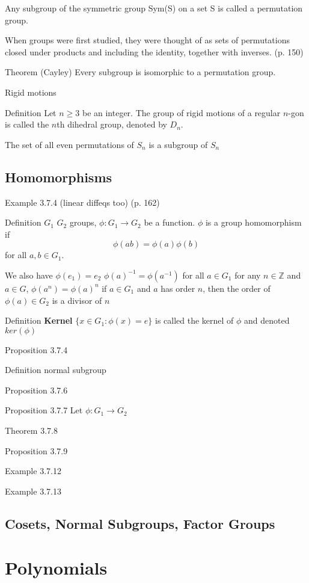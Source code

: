 \documentclass[12pt]{article}
\newcommand{\Z}{\mathbb{Z}}
\begin{document}
Any subgroup of the symmetric group Sym(S) on a set S is called a permutation group.

When groups were first studied, they were thought of as sets of permutations closed under products and including the identity, together with inverses. (p. 150)

Theorem (Cayley) Every subgroup is isomorphic to a permutation group.

Rigid motions

Definition Let $n \geq 3$ be an integer. The group of rigid motions of a regular $n$-gon is called the $n$th dihedral group, denoted by $D_n$.

The set of all even permutations of $S_n$ is a subgroup of $S_n$

\subsection{Homomorphisms}

Example 3.7.4 (linear diffeqs too) (p. 162)

Definition $G_1$ $G_2$ groups, $\phi : G_1 \to G_2$ be a function. $\phi$ is a group homomorphism if $$\phi(ab) = \phi(a)\phi(b)$$ for all $a, b \in G_1$.

We also have $\phi(e_1) = e_2$
 $\phi(a)^{-1} = \phi(a^{-1})$ for all $a \in G_1$
 for any $n \in \Z$ and $a \in G$, $\phi(a^n) = \phi(a)^n$
 if $a \in G_1$ and $a$ has order $n$, then the order of $\phi(a) \in G_2$ is a divisor of $n$

Definition \textbf{Kernel} $\{ x \in G_1 : \phi(x) = e \}$ is called the kernel of $\phi$ and denoted $ker(\phi)$

Proposition 3.7.4

Definition normal subgroup

Proposition 3.7.6

Proposition 3.7.7 Let $\phi : G_1 \to G_2$

Theorem 3.7.8

Proposition 3.7.9

Example 3.7.12

Example 3.7.13

\subsection{Cosets, Normal Subgroups, Factor Groups}

\section{Polynomials}
\end{document}
